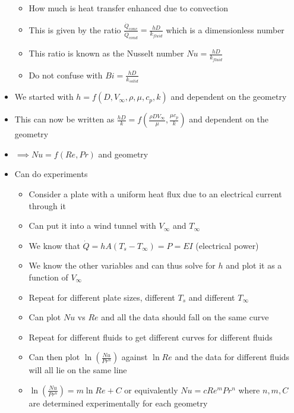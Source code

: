 \documentclass[12pt]{article}
\begin{document}
\begin{itemize}
\begin{itemize}
        \item How much is heat transfer enhanced due to convection 
        \item This is given by the ratio $\frac{\dot{Q}_{conv}}{\dot{Q}_{cond}} = \frac{hD}{k_{fluid}}$ which is a dimensionless number
        \item This ratio is known as the Nusselt number $Nu = \frac{hD}{k_{fluid}}$
        \item Do not confuse with $Bi = \frac{hD}{k_{solid}}$
    \end{itemize}
    \item We started with $h = f(D, V_{\infty}, \rho, \mu, c_p, k)$ and dependent on the geometry
    \item This can now be written as $\frac{hD}{k} = f \left(\frac{\rho D V_{\infty}}{\mu} , \frac{\mu c_p}{k} \right)$ and dependent on the geometry
    \item $\implies Nu = f(Re, Pr)$ and geometry
    \item Can do experiments \begin{itemize}
        \item Consider a plate with a uniform heat flux due to an electrical current through it
        \item Can put it into a wind tunnel with $V_{\infty}$ and $T_{\infty}$
        \item We know that $\dot{Q} = h A(T_s - T_{\infty}) = P = EI $ (electrical power)
        \item We know the other variables and can thus solve for $h$ and plot it as a function of $V_{\infty}$
        \item Repeat for different plate sizes, different $T_s$ and different $T_{\infty}$
        \item Can plot $Nu$ vs $Re$ and all the data should fall on the same curve
        \item Repeat for different fluids to get different curves for different fluids
        \item Can then plot $\ln (\frac{Nu}{Pr^n})$ against $\ln Re$ and the data for different fluids will all lie on the same line
        \item $\ln (\frac{Nu}{Pr^n}) = m \ln Re + C$ or equivalently $Nu = c Re^m Pr^n$ where $n, m, C$ are determined experimentally for each geometry
    \end{itemize}
\end{itemize}
\end{document}

